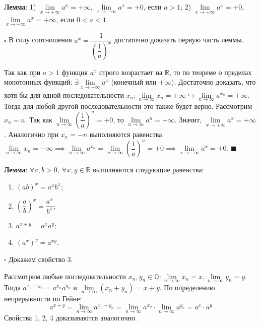 \documentclass[12pt, a4paper, reqno]{article}
\begin{document}
    \textbf{Лемма}: 1) $\lim\limits_{x\to +\infty} a^x = +\infty$, $\lim\limits_{x\to -\infty}
    a^x = +0$, если $a > 1$; 2) $\lim\limits_{x\to +\infty} a^x = +0$, $\lim\limits_{x\to -\infty}
    a^x = +\infty$, если $0< a < 1$.

    $\square$ В силу соотношения $a^x = \dfrac{1}{\left(\dfrac{1}{a}\right)^x}$ достаточно доказать первую
    часть леммы.

    Так как при $a > 1$ функция $a^x$ строго возрастает на $\mathbb{R}$, то по теореме о пределах
    монотонных функций: $\exists \lim\limits_{x\to +\infty} a^x$ (конечный или $+\infty$). Достаточно
    доказать, что хотя бы для одной последовательности $x_n: \lim\limits_{n\to\infty} x_n = +\infty
    \hookrightarrow \lim\limits_{n\to\infty} a^{x_n} = +\infty$. Тогда для любой другой
    последовательности это также будет верно. Рассмотрим $x_n = n$. Так как $\lim\limits_{n\to\infty}
    \left(\dfrac{1}{a}\right)^n = +0$, то $\lim\limits_{n\to\infty} a^n = +\infty$. Значит,
    $\lim\limits_{x\to +\infty} a^x = +\infty$. Аналогично при $x_n = -n$ выполняются равенства
    $\lim\limits_{n\to\infty} x_n = -\infty \implies \lim\limits_{n\to\infty} a^{x_n} =
    \lim\limits_{n\to\infty} \left(\dfrac{1}{a}\right)^n = +0 \implies \lim\limits_{x\to -\infty}
    a^x = +0$. $\blacksquare$

    \textbf{Лемма}: $\forall a, b > 0,\ \forall x, y\in\mathbb{R}$ выполняются следующие равенства:
    \begin{enumerate}
        \item $(ab)^x = a^xb^x$;
        \item $\left(\dfrac{a}{b}\right)^x = \dfrac{a^x}{b^x}$;
        \item $a^{x+y} = a^xa^y$;
        \item $(a^x)^y = a^{xy}$.
    \end{enumerate}
    $\square$ Докажем свойство 3.

    Рассмотрим любые последовательности $x_n, y_n\in\mathbb{Q}:
    \lim\limits_{n\to\infty} x_n = x, \lim\limits_{n\to\infty} y_n = y$. Тогда $a^{x_n + y_n} =
    a^{x_n}a^{y_n}$ и $\lim\limits_{n\to\infty} (x_n + y_n) = x + y$. По определению непрерывности
    по Гейне:
    \begin{equation*}
        a^{x + y} = \lim\limits_{n\to\infty} a^{x_n + y_n} = \lim\limits_{n\to\infty} a^{x_n}\cdot
        \lim\limits_{n\to\infty} a^{y_n} = a^x\cdot a^y
    \end{equation*}
    Свойства 1, 2, 4 доказываются аналогично.
\end{document}
